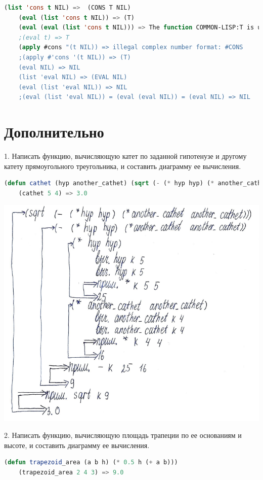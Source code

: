 \documentclass[12pt]{report}
\begin{document}
 
\begin{lstlisting}[language=Lisp]
	(list 'cons t NIL) =>  (CONS T NIL)
	(eval (list 'cons t NIL)) => (T)
	(eval (eval (list 'cons t NIL))) => The function COMMON-LISP:T is undefined
	;(eval t) => T
	(apply #cons "(t NIL)) => illegal complex number format: #CONS
	;(apply #'cons '(t NIL)) => (T)
	(eval NIL) => NIL
	(list 'eval NIL) => (EVAL NIL) 
	(eval (list 'eval NIL)) => NIL
	;(eval (list 'eval NIL)) = (eval (eval NIL)) = (eval NIL) => NIL
\end{lstlisting}

\section*{Дополнительно}

1. Написать функцию, вычисляющую катет по заданной гипотенузе и другому катету  прямоугольного треугольника, и составить диаграмму ее вычисления.

\begin{lstlisting}[language=Lisp]
	(defun cathet (hyp another_cathet) (sqrt (- (* hyp hyp) (* another_cathet another_cathet))))
	(cathet 5 4) => 3.0
\end{lstlisting}

\includegraphics[scale=1.2]{img/d1}

2. Написать функцию, вычисляющую площадь трапеции по ее основаниям и высоте, и составить диаграмму ее вычисления.

\begin{lstlisting}[language=Lisp]
	(defun trapezoid_area (a b h) (* 0.5 h (+ a b)))
	(trapezoid_area 2 4 3) => 9.0
\end{lstlisting}
\end{document}
